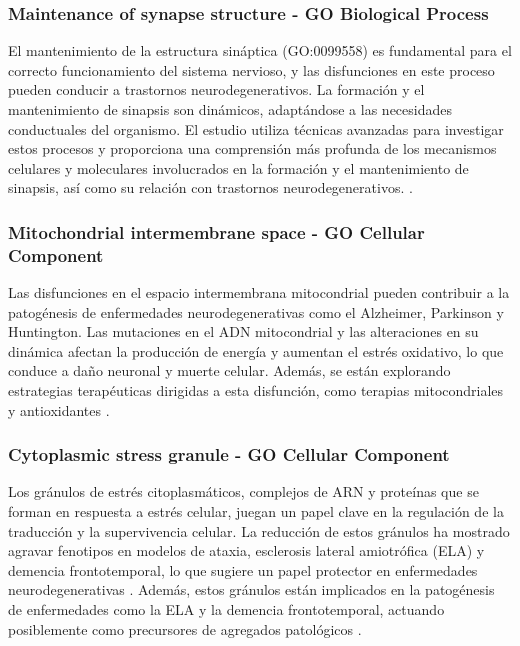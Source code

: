 \subsubsection{Maintenance of synapse structure - GO Biological Process}
El mantenimiento de la estructura sináptica (GO:0099558) es fundamental para el correcto funcionamiento del sistema nervioso, y las disfunciones en este proceso pueden conducir a trastornos neurodegenerativos. La formación y el mantenimiento de sinapsis son dinámicos, adaptándose a las necesidades conductuales del organismo. El estudio utiliza técnicas avanzadas para investigar estos procesos y proporciona una comprensión más profunda de los mecanismos celulares y moleculares involucrados en la formación y el mantenimiento de sinapsis, así como su relación con trastornos neurodegenerativos. \cite{Batool2019}.


\subsubsection{Mitochondrial intermembrane space - GO Cellular Component}
Las disfunciones en el espacio intermembrana mitocondrial pueden contribuir a la patogénesis de enfermedades neurodegenerativas como el Alzheimer, Parkinson y Huntington. Las mutaciones en el ADN mitocondrial y las alteraciones en su dinámica afectan la producción de energía y aumentan el estrés oxidativo, lo que conduce a daño neuronal y muerte celular. Además, se están explorando estrategias terapéuticas dirigidas a esta disfunción, como terapias mitocondriales y antioxidantes \cite{Kathiresan2024}.


\subsubsection{Cytoplasmic stress granule - GO Cellular Component}
Los gránulos de estrés citoplasmáticos, complejos de ARN y proteínas que se forman en respuesta a estrés celular, juegan un papel clave en la regulación de la traducción y la supervivencia celular. La reducción de estos gránulos ha mostrado agravar fenotipos en modelos de ataxia, esclerosis lateral amiotrófica (ELA) y demencia frontotemporal, lo que sugiere un papel protector en enfermedades neurodegenerativas \cite{10.1093/nar/gkae655}. Además, estos gránulos están implicados en la patogénesis de enfermedades como la ELA y la demencia frontotemporal, actuando posiblemente como precursores de agregados patológicos \cite{PMID:34248597}.

